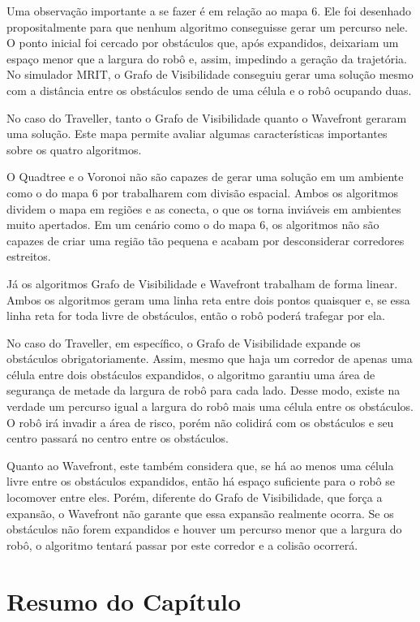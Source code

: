 Uma observação importante a se fazer é em relação ao mapa 6. Ele foi desenhado propositalmente para que nenhum algoritmo conseguisse gerar um percurso nele. O ponto inicial foi cercado por obstáculos que, após expandidos, deixariam um espaço menor que a largura do robô e, assim, impedindo a geração da trajetória. No simulador MRIT, o Grafo de Visibilidade conseguiu gerar uma solução mesmo com a distância entre os obstáculos sendo de uma célula e o robô ocupando duas.

No caso do Traveller, tanto o Grafo de Visibilidade quanto o Wavefront geraram uma solução. Este mapa permite avaliar algumas características importantes sobre os quatro algoritmos.

O Quadtree e o Voronoi não são capazes de gerar uma solução em um ambiente como o do mapa 6 por trabalharem com divisão espacial. Ambos os algoritmos dividem o mapa em regiões e as conecta, o que os torna inviáveis em ambientes muito apertados. Em um cenário como o do mapa 6, os algoritmos não são capazes de criar uma região tão pequena e acabam por desconsiderar corredores estreitos.

Já os algoritmos Grafo de Visibilidade e Wavefront trabalham de forma linear. Ambos os algoritmos geram uma linha reta entre dois pontos quaisquer e, se essa linha reta for toda livre de obstáculos, então o robô poderá trafegar por ela.

No caso do Traveller, em específico, o Grafo de Visibilidade expande os obstáculos obrigatoriamente. Assim, mesmo que haja um corredor de apenas uma célula entre dois obstáculos expandidos, o algoritmo garantiu uma área de segurança de metade da largura de robô para cada lado. Desse modo, existe na verdade um percurso igual a largura do robô mais uma célula entre os obstáculos. O robô irá invadir a área de risco, porém não colidirá com os obstáculos e seu centro passará no centro entre os obstáculos.

Quanto ao Wavefront, este também considera que, se há ao menos uma célula livre entre os obstáculos expandidos, então há espaço suficiente para o robô se locomover entre eles. Porém, diferente do Grafo de Visibilidade, que força a expansão, o Wavefront não garante que essa expansão realmente ocorra. Se os obstáculos não forem expandidos e houver um percurso menor que a largura do robô, o algoritmo tentará passar por este corredor e a colisão ocorrerá.

\section{Resumo do Capítulo}

